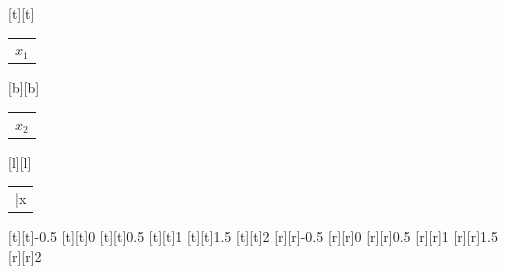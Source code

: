 %    
%
%
\begin{psfrags}%
\psfragscanon%
%
[t][t]{\color[rgb]{0,0,0}\setlength{\tabcolsep}{0pt}\begin{tabular}{c}$x_1$\end{tabular}}%
[b][b]{\color[rgb]{0,0,0}\setlength{\tabcolsep}{0pt}\begin{tabular}{c}$x_2$\end{tabular}}%
[l][l]{\color[rgb]{0,0,0}\setlength{\tabcolsep}{0pt}\begin{tabular}{l}\bar{x}\end{tabular}}%
%
[t][t]{-0.5}%
[t][t]{0}%
[t][t]{0.5}%
[t][t]{1}%
[t][t]{1.5}%
[t][t]{2}%
%
[r][r]{-0.5}%
[r][r]{0}%
[r][r]{0.5}%
[r][r]{1}%
[r][r]{1.5}%
[r][r]{2}%
%
%
\end{psfrags}%
%
